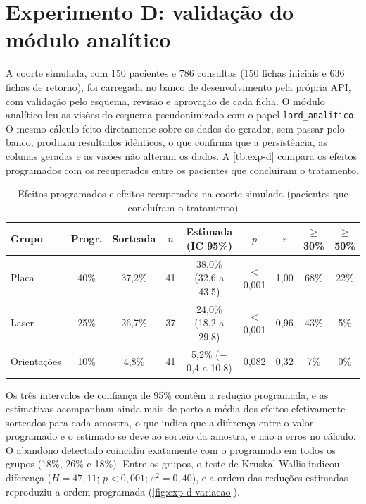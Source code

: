 \section{Experimento D: validação do módulo analítico}
\label{sec:res-exp-d}

A coorte simulada, com 150 pacientes e 786 consultas (150 fichas iniciais e 636 fichas de retorno), foi carregada no banco de desenvolvimento pela própria API, com validação pelo esquema, revisão e aprovação de cada ficha. O módulo analítico leu as visões do esquema pseudonimizado com o papel \texttt{lord\_analitico}. O mesmo cálculo feito diretamente sobre os dados do gerador, sem passar pelo banco, produziu resultados idênticos, o que confirma que a persistência, as colunas geradas e as visões não alteram os dados. A \autoref{tb:exp-d} compara os efeitos programados com os recuperados entre os pacientes que concluíram o tratamento.

\begin{table}[htbp]
	\caption{Efeitos programados e efeitos recuperados na coorte simulada (pacientes que concluíram o tratamento)}
	\label{tb:exp-d}
	\footnotesize
	\centering
	\begin{tabular}{lcccccccc}
		\hline
		\textbf{Grupo} & \textbf{Progr.} & \textbf{Sorteada} & \textbf{$n$} & \textbf{Estimada (IC 95\%)} & \textbf{$p$} & \textbf{$r$} & \textbf{$\geq$30\%} & \textbf{$\geq$50\%} \\ \hline
		Placa & 40\% & 37,2\% & 41 & 38,0\% (32,6 a 43,5) & $<$0,001 & 1,00 & 68\% & 22\% \\
		Laser & 25\% & 26,7\% & 37 & 24,0\% (18,2 a 29,8) & $<$0,001 & 0,96 & 43\% & 5\% \\
		Orientações & 10\% & 4,8\% & 41 & 5,2\% ($-$0,4 a 10,8) & 0,082 & 0,32 & 7\% & 0\% \\ \hline
	\end{tabular}
\end{table}

Os três intervalos de confiança de 95\% contêm a redução programada, e as estimativas acompanham ainda mais de perto a média dos efeitos efetivamente sorteados para cada amostra, o que indica que a diferença entre o valor programado e o estimado se deve ao sorteio da amostra, e não a erros no cálculo. O abandono detectado coincidiu exatamente com o programado em todos os grupos (18\%, 26\% e 18\%). Entre os grupos, o teste de Kruskal-Wallis indicou diferença ($H = 47{,}11$; $p < 0{,}001$; $\varepsilon^2 = 0{,}40$), e a ordem das reduções estimadas reproduziu a ordem programada (\autoref{fig:exp-d-variacao}).

